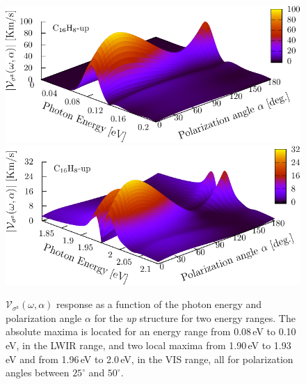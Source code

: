 \documentclass[prb,11pt,tightenlines,twocolumn,aps]{revtex4-1}
\begin{document}
\begin{figure}[t]
    \centering
    \includegraphics[width=\linewidth]{upplots/up-3d-svaz-1}
    \\
    \includegraphics[width=\linewidth]{upplots/up-3d-svaz-2}

    \caption{$\mathcal{V}_{\sigma^{\mathrm{z}}}(\omega,\alpha)$ response
    as a function of the photon energy and polarization angle $\alpha$ for the
    \emph{up} structure for two energy ranges. The absolute maxima is located
    for an energy range from 0.08\,eV to 0.10\,eV, in the LWIR
   range, and two local maxima from 1.90\,eV to 1.93\,eV and from
    1.96\,eV to 2.0\,eV, in the VIS range, all for polarization
    angles between $25^{\circ}$ and $50^{\circ}$.}
    \label{fig:up-3d-vsz}   
\end{figure}
\end{document}

